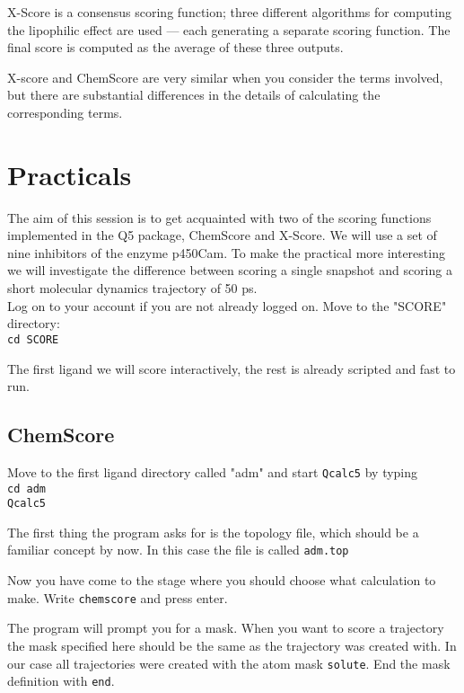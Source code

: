 \documentclass[a4paper,12pt]{article}
\newcommand{\subsctn}[1]{\subsection{#1}}
\newcommand{\qcalc}{\texttt{Qcalc5}}
\begin{document}
X-Score is a consensus scoring function; three different
algorithms for computing the lipophilic effect are used --- each
generating a separate scoring function. The final score is
computed as the average of these three outputs.

X-score and ChemScore are very similar when you consider the terms
involved, but there are substantial differences in the details of
calculating the corresponding terms.



\section{Practicals}

The aim of this session is to get acquainted with two of the
scoring functions implemented in the Q5 package, ChemScore and
X-Score. We will use a set of nine inhibitors of the enzyme
p450Cam. To make the practical more interesting we will
investigate the difference between scoring a single snapshot and
scoring a short molecular dynamics trajectory of 50 ps. \\

\noindent Log on to your account if you are not already logged on.
Move to the "SCORE" directory:\\
 \texttt{cd SCORE}

\noindent The first ligand we will score interactively, the rest
is already scripted and fast to run.

\subsctn {ChemScore}

Move to the first ligand directory called "adm" and start {\qcalc}
by
typing\\
 \texttt{cd adm} \\
 \qcalc %

\noindent The first thing the program asks for is the topology
file, which should be a familiar concept by now. In this case the
file is called \texttt{adm.top}

\noindent Now you have come to the stage where you should choose
what calculation to make. Write \texttt{chemscore} and press
enter.

\noindent The program will prompt you for a mask. When you want to
score a trajectory the mask specified here should be the same as
the trajectory was created with. In our case all trajectories were
created with the atom mask \texttt{solute}. End the mask
definition with \texttt{end}.
\end{document}
